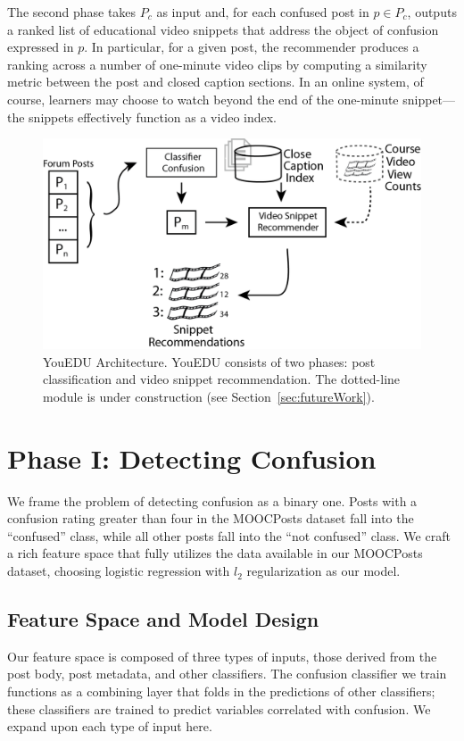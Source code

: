 \documentclass{edm_template}
\begin{document}
The second phase takes $P_{c}$ as input and, for each confused post in $p \in P_{c}$, outputs a ranked list of educational video snippets that address the object of confusion expressed in $p$. In particular, for a given post, the recommender produces a ranking across a number of one-minute video clips by computing a similarity metric between the post and closed caption sections. In an online system, of course, learners may choose to watch beyond the end of the one-minute snippet---the snippets effectively function as a video index.
\begin{figure}[htp]
       \centering
       \includegraphics[width=1.0\textwidth]{../Figs/youEduArch.png}
       \caption{\textnormal{YouEDU Architecture. YouEDU 
           consists of two phases: post classification and video
           snippet recommendation. The dotted-line module is under
           construction (see Section~\ref{sec:futureWork}).}}
       \label{figure:architecture}
\end{figure}

\section{Phase I: Detecting Confusion}
\label{sec:confusionDetection}

We frame the problem of detecting confusion as a binary one. Posts with a confusion rating greater than four in the MOOCPosts dataset fall into the ``confused'' class, while all other posts fall into the ``not confused'' class. We craft a rich feature space that fully utilizes the data available in our MOOCPosts dataset, choosing logistic regression with $l_{2}$ regularization as our model.

\subsection{Feature Space and Model Design}
Our feature space is composed of three types of inputs, those derived from the post body, post metadata, and other classifiers. The confusion classifier we train functions as a combining layer that folds in the predictions of other classifiers; these classifiers are trained to predict variables correlated with confusion. We expand upon each type of input here.
\end{document}
